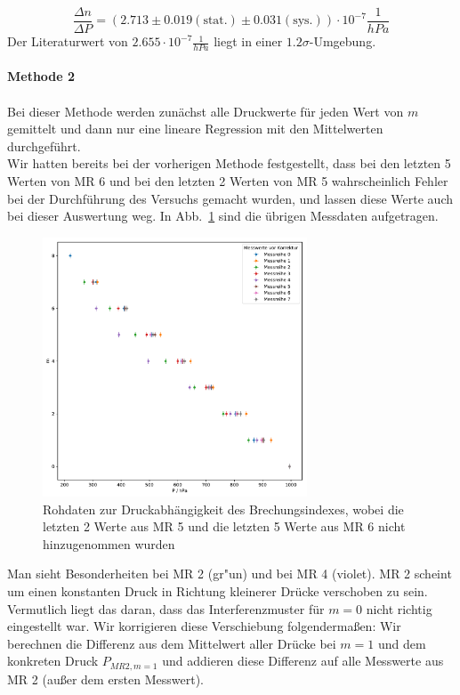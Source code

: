 \documentclass[12pt,a4paper]{article}
\begin{document}
\begin{equation}
\frac{\Delta n}{\Delta P}=(2.713\pm 0.019(\text{stat.})\pm 0.031(\text{sys.}))\cdot10^{-7}\frac{1}{hPa}
\end{equation}
Der Literaturwert von $2.655\cdot10^{-7}\frac{1}{hPa}$ liegt in einer $1.2\sigma$-Umgebung.\\
\\
\textbf{Methode 2}\\
\\
Bei dieser Methode werden zunächst alle Druckwerte für jeden Wert von $m$ gemittelt und dann nur eine lineare Regression mit den Mittelwerten durchgeführt.\\
Wir hatten bereits bei der vorherigen Methode festgestellt, dass bei den letzten 5 Werten von MR 6 und bei den letzten 2 Werten von MR 5 wahrscheinlich Fehler bei der Durchführung des Versuchs gemacht wurden, und lassen diese Werte auch bei dieser Auswertung weg. In Abb.~\ref{Methode2vorKorr} sind die übrigen Messdaten aufgetragen.
\begin{figure}[H]
	\centering
	\includegraphics[width=0.7\textwidth]{Python/Methode2vorKorr.pdf}
	\caption{Rohdaten zur Druckabhängigkeit des Brechungsindexes, wobei die letzten 2 Werte aus MR 5 und die letzten 5 Werte aus MR 6 nicht hinzugenommen wurden}
	\label{Methode2vorKorr}
\end{figure}
Man sieht Besonderheiten bei MR 2 (gr"un) und bei MR 4 (violet). MR 2 scheint um einen konstanten Druck in Richtung kleinerer Drücke verschoben zu sein. Vermutlich liegt das daran, dass das Interferenzmuster für $m=0$ nicht richtig eingestellt war. Wir korrigieren diese Verschiebung folgendermaßen: Wir berechnen die Differenz aus dem Mittelwert aller Drücke bei $m=1$ und dem konkreten Druck $P_{MR2,m=1}$  und addieren diese Differenz auf alle Messwerte aus MR 2 (außer dem ersten Messwert).\\
\end{document}
